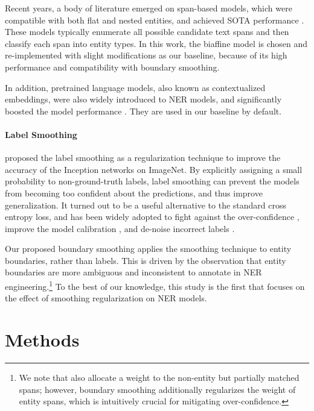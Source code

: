 \documentclass[11pt]{article}
\begin{document}
Recent years, a body of literature emerged on span-based models, which were compatible with both flat and nested entities, and achieved SOTA performance \citep{eberts2019span,yu-etal-2020-named,li-etal-2021-span}. These models typically enumerate all possible candidate text spans and then classify each span into entity types. In this work, the biaffine model \citep{yu-etal-2020-named} is chosen and re-implemented with slight modifications as our baseline, because of its high performance and compatibility with boundary smoothing. 

In addition, pretrained language models, also known as contextualized embeddings, were also widely introduced to NER models, and significantly boosted the model performance \citep{peters-etal-2018-deep, devlin-etal-2019-bert}. They are used in our baseline by default. 

\paragraph{Label Smoothing} \citet{szegedy2016rethinking} proposed the label smoothing as a regularization technique to improve the accuracy of the Inception networks on ImageNet. By explicitly assigning a small probability to non-ground-truth labels, label smoothing can prevent the models from becoming too confident about the predictions, and thus improve generalization. It turned out to be a useful alternative to the standard cross entropy loss, and has been widely adopted to fight against the over-confidence \citep{zoph2018learning,chorowski2017towards,vaswani2017attention}, improve the model calibration \citep{muller2019when}, and de-noise incorrect labels \citep{lukasik2020does}. 

Our proposed boundary smoothing applies the smoothing technique to entity boundaries, rather than labels. This is driven by the observation that entity boundaries are more ambiguous and inconsistent to annotate in NER engineering.\footnote{We note that \citet{shen-etal-2021-locate} also allocate a weight to the non-entity but partially matched spans; however, boundary smoothing additionally regularizes the weight of entity spans, which is intuitively crucial for mitigating over-confidence.} To the best of our knowledge, this study is the first that focuses on the effect of smoothing regularization on NER models. 


\section{Methods} \label{sec:methods}
\end{document}

